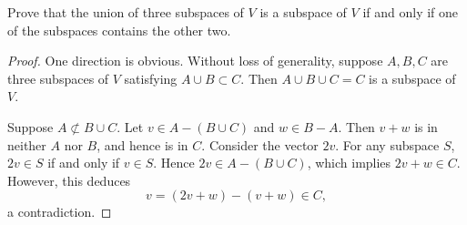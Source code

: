 \begin{exercise}{13}
	Prove that the union of three subspaces of \( V \) is a subspace of \( V \) if and only if one of the subspaces contains the other two.

\end{exercise}

\begin{proof}
	One direction is obvious. Without loss of generality, suppose \( A, B, C \) are three subspaces of \( V \) satisfying \( A \cup B \subset C \). Then \( A \cup B \cup C = C \) is a subspace of \( V \).
	
	Suppose \( A \not\subset B \cup C \). Let \( v \in A - (B \cup C) \) and \( w \in B - A \). Then \( v + w \) is in neither \( A \) nor \( B \), and hence is in \( C \). Consider the vector \( 2v \). For any subspace \( S \), \( 2v \in S \) if and only if \( v \in S \). Hence \( 2v \in A - (B \cup C) \), which implies \( 2v + w \in C \). However, this deduces
	\[
		v = (2v + w) - (v + w) \in C,
	\]
	a contradiction.


\end{proof}

